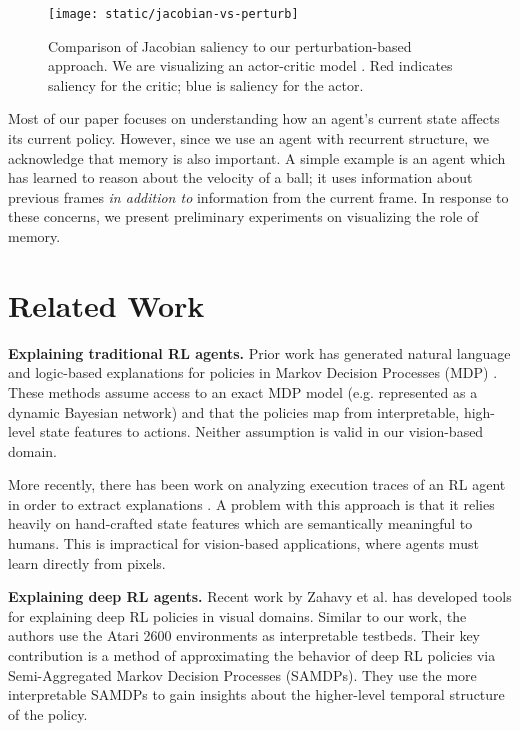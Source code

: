 \documentclass{article}
\begin{document}
\begin{figure}[h!]
\centering
\texttt{[image: static/jacobian-vs-perturb]}
\caption{Comparison of Jacobian saliency to our perturbation-based approach. We are visualizing an actor-critic model \cite{Mnih2016AsynchronousLearning}. Red indicates saliency for the critic; blue is saliency for the actor.}
\label{fig:jac-vs-pert}
\end{figure}

Most of our paper focuses on understanding how an agent's current state affects its current policy. However, since we use an agent with recurrent structure, we acknowledge that memory is also important. A simple example is an agent which has learned to reason about the velocity of a ball; it uses information about previous frames \textit{in addition to} information from the current frame. In response to these concerns, we present preliminary experiments on visualizing the role of memory.

\section{Related Work}

\textbf{Explaining traditional RL agents.} Prior work has generated natural language and logic-based explanations for policies in Markov Decision Processes (MDP) \cite{Dodson2011AProcesses, Elizalde2008PolicyProcesses, Khan2009MinimalProcesses}. These methods assume access to an exact MDP model (e.g. represented as a dynamic Bayesian network) and that the policies map from interpretable, high-level state features to actions. Neither assumption is valid in our vision-based domain.

More recently, there has been work on analyzing execution traces of an RL agent in order to extract explanations \cite{Hayes2017ImprovingExplanation}. A problem with this approach is that it relies heavily on hand-crafted state features which are semantically meaningful to humans. This is impractical for vision-based applications, where agents must learn directly from pixels.

\textbf{Explaining deep RL agents.} Recent work by Zahavy et al. \cite{Zahavy2016GrayingDQNs} has developed tools for explaining deep RL policies in visual domains. Similar to our work, the authors use the Atari 2600 environments as interpretable testbeds. Their key contribution is a method of approximating the behavior of deep RL policies via Semi-Aggregated Markov Decision Processes (SAMDPs). They use the more interpretable SAMDPs to gain insights about the higher-level temporal structure of the policy.
\end{document}
